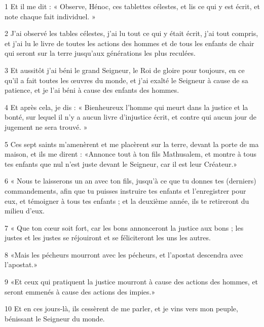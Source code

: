 \par 1 Et il me dit : « Observe, Hénoc, ces tablettes célestes, et lis ce qui y est écrit, et note chaque fait individuel. »
\par 2 J'ai observé les tables célestes, j'ai lu tout ce qui y était écrit, j'ai tout compris, et j'ai lu le livre de toutes les actions des hommes et de tous les enfants de chair qui seront sur la terre jusqu'aux générations les plus reculées.
\par 3 Et aussitôt j'ai béni le grand Seigneur, le Roi de gloire pour toujours, en ce qu'il a fait toutes les œuvres du monde, et j'ai exalté le Seigneur à cause de sa patience, et je l'ai béni à cause des enfants des hommes.
\par 4 Et après cela, je dis : « Bienheureux l'homme qui meurt dans la justice et la bonté, sur lequel il n'y a aucun livre d'injustice écrit, et contre qui aucun jour de jugement ne sera trouvé. »
\par 5 Ces sept saints m'amenèrent et me placèrent sur la terre, devant la porte de ma maison, et ils me dirent : «Annonce tout à ton fils Mathusalem, et montre à tous tes enfants que nul n'est juste devant le Seigneur, car il est leur Créateur.»
\par 6 « Nous te laisserons un an avec ton fils, jusqu'à ce que tu donnes tes (derniers) commandements, afin que tu puisses instruire tes enfants et l'enregistrer pour eux, et témoigner à tous tes enfants ; et la deuxième année, ils te retireront du milieu d’eux.
\par 7 « Que ton cœur soit fort, car les bons annonceront la justice aux bons ; les justes et les justes se réjouiront et se féliciteront les uns les autres.
\par 8 «Mais les pécheurs mourront avec les pécheurs, et l'apostat descendra avec l'apostat.»
\par 9 «Et ceux qui pratiquent la justice mourront à cause des actions des hommes, et seront emmenés à cause des actions des impies.»
\par 10 Et en ces jours-là, ils cessèrent de me parler, et je vins vers mon peuple, bénissant le Seigneur du monde.


